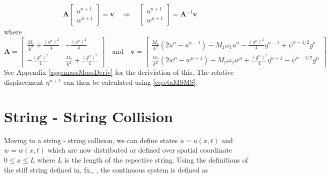 \documentclass{article}
\begin{document}
\begin{align}
    \mathbf{A}
    \begin{bmatrix}
        u^{n+1}\\
        w^{n+1}
    \end{bmatrix}
    = 
    \mathbf{v} \quad\Rightarrow \quad 
    \begin{bmatrix}
        u^{n+1}\\
        w^{n+1}
    \end{bmatrix} = \mathbf{A}^{-1}\mathbf{v}
\end{align}
where 
\begin{equation}
    \mathbf{A} = \begin{bmatrix}
        \frac{M_1}{k^2}+\frac{(g^n)^2}{4} & -\frac{(g^n)^2}{4} \\
        -\frac{(g^n)^2}{4} & \frac{M_2}{k^2} + \frac{(g^n)^2}{4}
    \end{bmatrix}
    \quad\text{and}\quad\mathbf{v} =
    \begin{bmatrix}
        \frac{M_1}{k^2}(2u^n-u^{n-1})-M_1\omega_1u^n-\frac{(g^n)^2}{4}\eta^{n-1}+\psi^{n-1/2}g^n\\
        \frac{M_2}{k^2}(2w^n-w^{n-1})-M_2\omega_2w^n+\frac{(g^n)^2}{4}\eta^{n-1}-\psi^{n-1/2}g^n
    \end{bmatrix}\nonumber
\end{equation}
See Appendix \ref{app:massMassDeriv} for the deriviation of this. The relative displacement $\eta^{n+1}$ can then be calculated using \eqref{eq:etaMSMS}.

\section{String - String Collision}\label{sec:stringString}
Moving to a string - string collision, we can define states $u = u(x,t)$ and $w = w(x,t)$ which are now distributed or defined over spatial coordinate $0\leq x\leq L$ where $L$ is the length of the repective string. Using the definitions of the stiff string defined in, fx., \cite{Bilbao2009}, the continuous system is defined as
\end{document}
